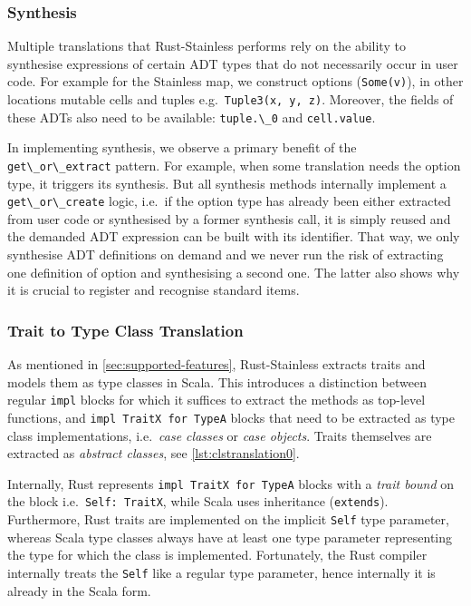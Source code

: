 \subsubsection{Synthesis}

Multiple translations that Rust-Stainless performs rely on the ability
to synthesise expressions of certain ADT types that do not necessarily
occur in user code. For example for the Stainless map, we construct
options (\passthrough{\lstinline!Some(v)!}), in other locations mutable
cells and tuples e.g.~\passthrough{\lstinline!Tuple3(x, y, z)!}.
Moreover, the fields of these ADTs also need to be available:
\passthrough{\lstinline!tuple.\_0!} and
\passthrough{\lstinline!cell.value!}.

In implementing synthesis, we observe a primary benefit of the
\passthrough{\lstinline!get\_or\_extract!} pattern. For example, when
some translation needs the option type, it triggers its synthesis.
But all synthesis methods internally implement a
\passthrough{\lstinline!get\_or\_create!} logic, i.e.~if the option type
has already been either extracted from user code or synthesised by a
former synthesis call, it is simply reused and the demanded ADT
expression can be built with its identifier. That way, we only
synthesise ADT definitions on demand and we never run the risk of
extracting one definition of option and synthesising a second one. The
latter also shows why it is crucial to register and recognise standard
items.

\subsubsection{Trait to Type Class Translation}
\label{type-class-extraction}

As mentioned in \autoref{sec:supported-features}, Rust-Stainless extracts traits
and models them as type classes in Scala. This introduces a distinction between
regular \lstinline!impl! blocks for which it suffices to extract the methods as
top-level functions, and \passthrough{\lstinline!impl TraitX for TypeA!} blocks
that need to be extracted as type class implementations, i.e.~\emph{case
classes} or \emph{case objects}. Traits themselves are extracted as
\emph{abstract classes}, see \autoref{lst:clstranslation0}.

Internally, Rust represents \passthrough{\lstinline!impl TraitX for TypeA!}
blocks with a \emph{trait bound} on the block i.e.~\passthrough{\lstinline!Self:
TraitX!}, while Scala uses inheritance (\passthrough{\lstinline!extends!}).
Furthermore, Rust traits are implemented on the implicit \lstinline!Self! type
parameter, whereas Scala type classes always have at least one type parameter
representing the type for which the class is implemented. Fortunately, the Rust
compiler internally treats the \lstinline!Self! like a regular type parameter,
hence internally it is already in the Scala form.


